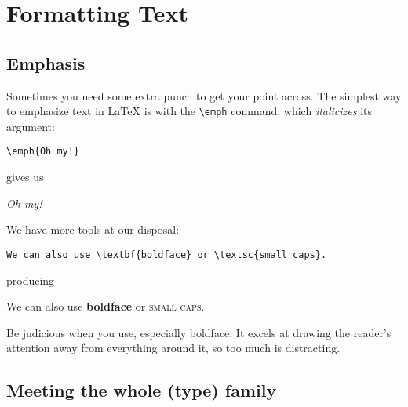 \chapter{Formatting Text}
\label{formatting}

\section{Emphasis}

Sometimes you need some extra punch to get your point across.
The simplest way to emphasize text in \LaTeX{} is with the \verb|\emph| command,
which \emph{italicizes} its argument:
\begin{leftfigure}
\begin{lstlisting}
\emph{Oh my!}
\end{lstlisting}
\end{leftfigure}
gives us
\begin{leftfigure}
\lm \emph{Oh my!}
\end{leftfigure}
We have more tools at our disposal:
\begin{leftfigure}
\begin{lstlisting}
We can also use \textbf{boldface} or \textsc{small caps}.
\end{lstlisting}
\end{leftfigure}
producing
\begin{leftfigure}
\lm%
We can also use \textbf{boldface} or \textsc{small caps}.
\end{leftfigure}
Be judicious when you use, especially boldface.
It excels at drawing the reader's attention away from everything around it,
so too much is distracting.

\section{Meeting the whole (type) family}

